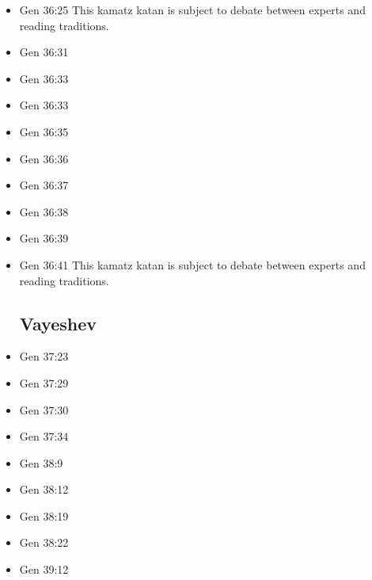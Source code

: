 \documentclass[14pt]{book}
\begin{document}
\begin{multicols}{2}
\begin{itemize}
\item Gen 36:25 This kamatz katan is subject to debate between experts and reading traditions.

\item Gen 36:31

\item Gen 36:33

\item Gen 36:33

\item Gen 36:35

\item Gen 36:36

\item Gen 36:37

\item Gen 36:38

\item Gen 36:39

\item Gen 36:41 This kamatz katan is subject to debate between experts and reading traditions.

\subsection{Vayeshev}

\item Gen 37:23

\item Gen 37:29

\item Gen 37:30

\item Gen 37:34

\item Gen 38:9

\item Gen 38:12

\item Gen 38:19

\item Gen 38:22

\item Gen 39:12


\end{itemize}
\end{multicols}
\end{document}

